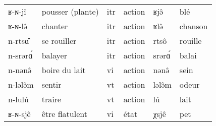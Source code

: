 \documentclass[11pt, a4paper]{book}              %
\newcommand{\ipa}[1]{{\phon \mbox{#1}}} %
\begin{document}
\begin{table} [H]
{\begin{tabular}{llllll}
\ipa{ʁ-ɴ-jî}  & pousser (plante)         & itr           & action         & \ipa{ʁjə̂}                 &  blé       \\
\ipa{ʁ-ɴ-lə̂}  & chanter        & itr           & action         & \ipa{ʁlə̂}                 &  chanson       \\
\ipa{n-rtsɑ̂}  & se rouiller        & itr           & action         & \ipa{rtsô}                 &  rouille       \\
\ipa{n-srərɑ́}  &   balayer        & itr           & action         & \ipa{srərɑ́}                 &  balai       \\
\ipa{n-nənə̂}  &   boire du lait        & vi           & action         & \ipa{nənə̂}                 &  sein     \\
\ipa{n-lələ̂m}  &  sentir        & vt           & action         & \ipa{lələ̂m}                 &  odeur     \\
\ipa{n-lulú}  &  traire        & vt           & action         & \ipa{lú}                 & lait    \\
\ipa{ʁ-ɴ-sjê}  &   être flatulent        & vi           & état         & \ipa{χsjê}                 & pet    \\

\hline
\end{tabular}
}
\end{table}
\end{document}
